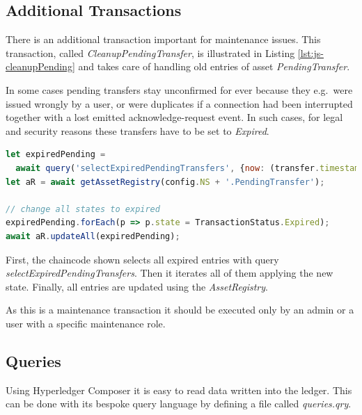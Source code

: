 \subsection{Additional Transactions}

There is an additional transaction important for maintenance issues. This transaction, called \textit{CleanupPendingTransfer}, is illustrated in Listing \ref{lst:js-cleanupPending} and takes care of handling old entries of asset \textit{PendingTransfer}.

In some cases pending transfers stay unconfirmed for ever because they e.g.\ were issued wrongly by a user, or were duplicates if a connection had been interrupted together with a lost emitted acknowledge-request event. In such cases, for legal and security reasons these transfers have to be set to \textit{Expired}.

\begin{center}
\begin{minipage}{0.8\textwidth}
\small
\begin{lstlisting}[language=javascript,firstnumber=1,caption={\bf\small clearDebt JavaScript excerpt}, captionpos=b,label=lst:js-cleanupPending]
let expiredPending =
  await query('selectExpiredPendingTransfers', {now: (transfer.timestamp)});
let aR = await getAssetRegistry(config.NS + '.PendingTransfer');

// change all states to expired
expiredPending.forEach(p => p.state = TransactionStatus.Expired);
await aR.updateAll(expiredPending);
\end{lstlisting}
\end{minipage}
\end{center}

First, the chaincode shown selects all expired entries with query \textit{selectExpiredPendingTransfers}. Then it iterates all of them applying the new state. Finally, all entries are updated using the \textit{AssetRegistry}.

As this is a maintenance transaction it should be executed only by an admin or a user with a specific maintenance role.

\subsection{Queries}
\label{subsec:queries}

Using Hyperledger Composer it is easy to read data written into the ledger. This can be done with its bespoke query language by defining a file called \textit{queries.qry}. 

